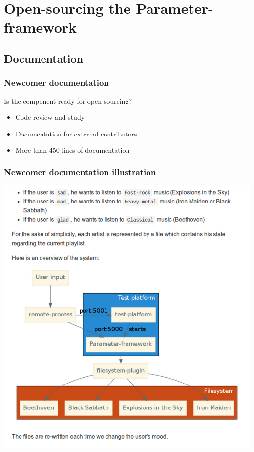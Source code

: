 %
%


\section{Open-sourcing the Parameter-framework}

\currentSectionToc

\subsection{Documentation}
\begin{frame}
    \frametitle{Newcomer documentation}
    \centering
    \begin{block}{Is the component ready for open-sourcing?}
        \begin{itemize}
            \item Code review and study
            \item Documentation for external contributors
            \item More than 450 lines of documentation
        \end{itemize}
    \end{block}
\end{frame}

\begin{frame}
    \frametitle{Newcomer documentation illustration}
    \centering
    \includegraphics[height=0.85\textheight]{../../report/src/img/tutos.pdf}
\end{frame}

